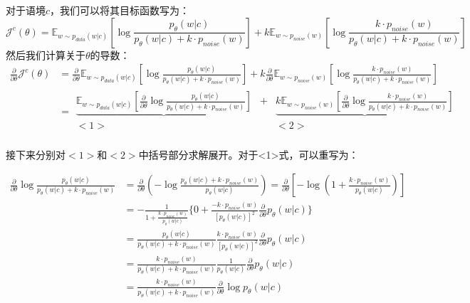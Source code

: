 \documentclass{article}
\begin{document}
对于语境$c$，我们可以将其目标函数写为：
\begin{equation}
    \mathcal{J}^c(\theta) = \mathbb{E}_{w \sim p_{data}(w|c)} \left[ \log \frac{p_\theta(w|c)}{p_\theta(w|c)+k \cdot p_{noise}(w)} \right]  + k  \mathbb{E}_{w \sim p_{noise}(w)} \left[ \log \frac{k \cdot p_{noise}(w)}{p_\theta(w|c)+k \cdot p_{noise}(w)}  \right] 
\end{equation}
然后我们计算关于$\theta$的导数：
\begin{equation}
    \begin{split}
        \frac{\partial}{\partial \theta} \mathcal{J}^c (\theta)  &= \frac{\partial}{\partial \theta} \mathbb{E}_{w \sim p_{data}(w|c)} \left[ \log \frac{p_\theta(w|c)}{p_\theta(w|c)+k \cdot p_{noise}(w)} \right]  + k \frac{\partial}{\partial \theta}  \mathbb{E}_{w \sim p_{noise}(w)} \left[ \log \frac{k \cdot p_{noise}(w)}{p_\theta(w|c)+k \cdot p_{noise}(w)}  \right] \\
        &= \begin{matrix}
            \underbrace{\mathbb{E}_{w \sim p_{data}(w|c)} \left[ \frac{\partial}{\partial \theta} \log \frac{p_\theta(w|c)}{p_\theta(w|c)+k \cdot p_{noise}(w)} \right]} & + & \underbrace{k  \mathbb{E}_{w \sim p_{noise}(w)} \left[ \frac{\partial}{\partial \theta} \log \frac{k \cdot p_{noise}(w)}{p_\theta(w|c)+k \cdot p_{noise}(w)}  \right]} \\
            <1> & & <2> \\
        \end{matrix}
    \end{split}
\end{equation}

接下来分别对$<1>$和$<2>$中括号部分求解展开。对于<1>式，可以重写为：

\begin{equation}
    \begin{split}
        \frac{\partial}{\partial \theta} \log \frac{p_\theta(w|c)}{p_\theta(w|c)+k \cdot p_{noise}(w)} &= \frac{\partial}{\partial \theta} (- \log \frac{p_\theta(w|c)+k \cdot p_{noise}(w)}{p_\theta(w|c)}) = \frac{\partial}{\partial \theta} \left[ -\log(1+ \frac{k \cdot p_{noise}(w)}{p_{\theta}(w|c)}) \right] \\
        &= - \frac{1}{1 + \frac{k \cdot p_{noise}(w)}{p_\theta (w|c)}} \{ 0 + \frac{- k \cdot p_{noise}(w)}{\left[ p_\theta(w|c) \right]^2} \frac{\partial}{\partial \theta} p_\theta(w|c) \}\\
        &= \frac{p_\theta(w|c)}{p_\theta(w|c) + k \cdot p_{noise}(w)} \frac{ k \cdot p_{noise}(w)}{\left[ p_\theta(w|c) \right]^2} \frac{\partial}{\partial \theta} p_\theta(w|c) \\
        &= \frac{k \cdot p_{noise}(w)}{p_\theta(w|c) + k \cdot p_{noise}(w)} \frac{1}{p_\theta(w|c)} \frac{\partial}{\partial \theta} p_\theta(w|c)\\
        &= \frac{k \cdot p_{noise}(w)}{p_\theta(w|c) + k \cdot p_{noise}(w)}  \frac{\partial}{\partial \theta} \log p_\theta(w|c)
    \end{split}
\end{equation}
\end{document}
